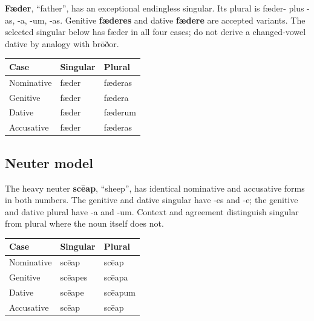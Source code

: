 \textbf{Fæder}, “father”, has an exceptional endingless singular. Its plural is fæder- plus -as, -a, -um, -as. Genitive \textbf{fæderes} and dative \textbf{fædere} are accepted variants. The selected singular below has fæder in all four cases; do not derive a changed-vowel dative by analogy with brōðor.

\par\begingroup
\fontsize{10.5}{13.2}\selectfont
\setlength{\LTleft}{0pt}\setlength{\LTright}{\fill}
\noindent
\begin{tabular}{@{}>{\raggedright\arraybackslash}p{39.46mm}>{\raggedright\arraybackslash}p{39.46mm}>{\raggedright\arraybackslash}p{39.46mm}@{}}
\toprule
\textbf{Case} & \textbf{Singular} & \textbf{Plural} \\
\midrule
Nominative & fæder & fæderas \\
Genitive & fæder & fædera \\
Dative & fæder & fæderum \\
Accusative & fæder & fæderas \\
\bottomrule
\end{tabular}
\par\endgroup

\subsection*{Neuter model}

The heavy neuter \textbf{scēap}, “sheep”, has identical nominative and accusative forms in both numbers. The genitive and dative singular have -es and -e; the genitive and dative plural have -a and -um. Context and agreement distinguish singular from plural where the noun itself does not.

\par\begingroup
\fontsize{10.5}{13.2}\selectfont
\setlength{\LTleft}{0pt}\setlength{\LTright}{\fill}
\noindent
\begin{tabular}{@{}>{\raggedright\arraybackslash}p{39.46mm}>{\raggedright\arraybackslash}p{39.46mm}>{\raggedright\arraybackslash}p{39.46mm}@{}}
\toprule
\textbf{Case} & \textbf{Singular} & \textbf{Plural} \\
\midrule
Nominative & scēap & scēap \\
Genitive & scēapes & scēapa \\
Dative & scēape & scēapum \\
Accusative & scēap & scēap \\
\bottomrule
\end{tabular}
\par\endgroup

